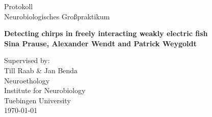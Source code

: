\begin{titlepage}
\begin{center}

\vspace*{0.5cm}
\Large
Protokoll\\
Neurobiologisches Großpraktikum\\
\vspace{1cm}

\Huge
\textbf{Detecting chirps in freely interacting weakly electric fish}\\
\Large
\vspace{1cm}
\textbf{Sina Prause, Alexander Wendt and Patrick Weygoldt}
\vspace{1cm}

\vfill

\large
\vspace{0.5cm}
Supervised by:\\
\vspace{0.5cm}
Till Raab \& Jan Benda\\
Neuroethology\\
Institute for Neurobiology\\
Tuebingen University\\
\vspace{1cm}
\today \\
\vspace{0.5cm}

        
\end{center}
\end{titlepage}
